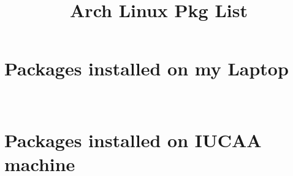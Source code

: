 \documentclass{../template/texnote}
\title{Arch Linux Pkg List}
\begin{document}
    \maketitle {}
	\section{Packages installed on my Laptop}
	\par
{} \\

\section{Packages installed on IUCAA machine}
\par
{}
    \printbibliography
\end{document}
